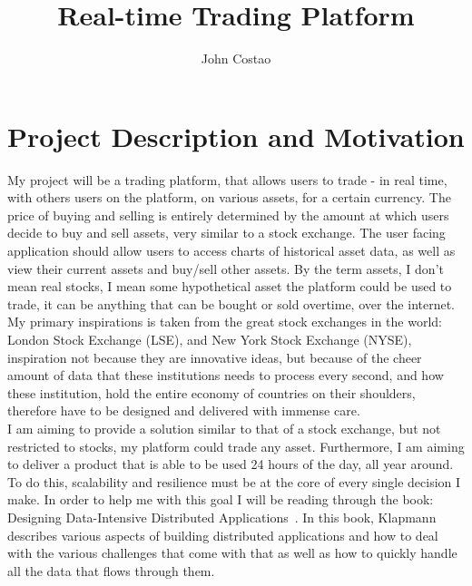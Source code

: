 \documentclass[titlepage]{article}
\title{Real-time Trading Platform}
\author{John Costao}
\begin{document}
\maketitle
  
\section{Project Description and Motivation}
My project will be a trading platform, that allows users to trade - in real time, with others users on the platform, on various assets, for a certain currency. The price of buying and selling is entirely determined by the amount at which users decide to buy and sell assets, very similar to a stock exchange. The user facing application should allow users to access charts of historical asset data, as well as view their current assets and buy/sell other assets. By the term assets, I don't mean real stocks, I mean some hypothetical asset the platform could be used to trade, it can be anything that can be bought or sold overtime, over the internet. \\

\noindent
My primary inspirations is taken from the great stock exchanges in the world: London Stock Exchange (LSE), and New York Stock Exchange (NYSE), inspiration not because they are innovative ideas, but because of the cheer amount of data that these institutions needs to process every second, and how these institution, hold the entire economy of countries on their shoulders, therefore have to be designed and delivered with immense care. \\

\noindent
I am aiming to provide a solution similar to that of a stock exchange, but not restricted to stocks, my platform could trade any asset. Furthermore, I am aiming to deliver a product that is able to be used 24 hours of the day, all year around. To do this, scalability and resilience must be at the core of every single decision I make. In order to help me with this goal I will be reading through the book: Designing Data-Intensive Distributed Applications~\cite{kleppmann_2021}. In this book, Klapmann describes various aspects of building distributed applications and how to deal with the various challenges that come with that as well as how to quickly handle all the data that flows through them. \\
\end{document}
